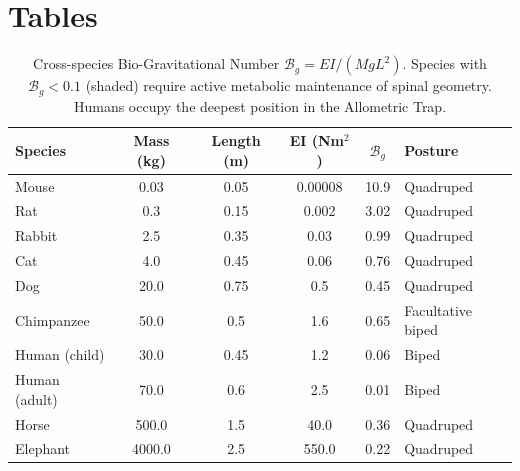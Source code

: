 \section*{Tables}

\begin{table}[h!]
\centering
\caption{Cross-species Bio-Gravitational Number $\mathcal{B}_g = EI/(MgL^2)$. Species with $\mathcal{B}_g < 0.1$ (shaded) require active metabolic maintenance of spinal geometry. Humans occupy the deepest position in the Allometric Trap.}
\label{tab:cross_species}
\small
\begin{tabular}{lccccl}
\toprule
\textbf{Species} & \textbf{Mass (kg)} & \textbf{Length (m)} & \textbf{EI (Nm$^2$)} & \textbf{$\mathcal{B}_g$} & \textbf{Posture} \\
\midrule
Mouse & 0.03 & 0.05 & 0.00008 & 10.9 & Quadruped \\
Rat & 0.3 & 0.15 & 0.002 & 3.02 & Quadruped \\
Rabbit & 2.5 & 0.35 & 0.03 & 0.99 & Quadruped \\
Cat & 4.0 & 0.45 & 0.06 & 0.76 & Quadruped \\
Dog & 20.0 & 0.75 & 0.5 & 0.45 & Quadruped \\
Chimpanzee & 50.0 & 0.5 & 1.6 & 0.65 & Facultative biped \\
\rowcolor{yellow!15} Human (child) & 30.0 & 0.45 & 1.2 & 0.06 & Biped \\
\rowcolor{yellow!15} Human (adult) & 70.0 & 0.6 & 2.5 & 0.01 & Biped \\
Horse & 500.0 & 1.5 & 40.0 & 0.36 & Quadruped \\
Elephant & 4000.0 & 2.5 & 550.0 & 0.22 & Quadruped \\
\bottomrule
\end{tabular}
\end{table}


